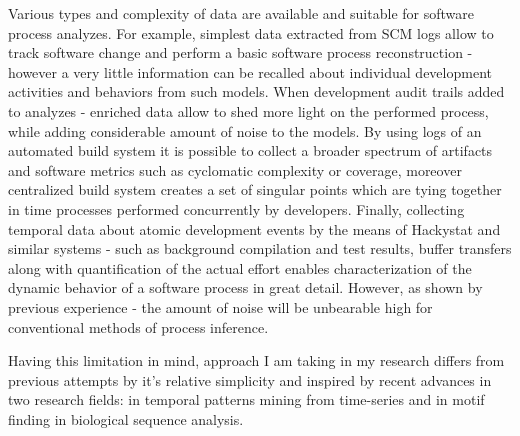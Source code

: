 \documentclass{sig-alternate}
\begin{document}
Various types and complexity of data are available and suitable for software process analyzes. For example, simplest data extracted from SCM logs allow to track software change and perform a basic software process reconstruction - however a very little information can be recalled about individual development activities and behaviors from such models. When development audit trails added to analyzes - enriched data allow to shed more light on the performed process, while adding considerable amount of noise to the models. By using logs of an automated build system it is possible to collect a broader spectrum of artifacts and software metrics such as cyclomatic complexity or coverage, moreover centralized build system creates a set of singular points which are tying together in time processes performed concurrently by developers. Finally, collecting temporal data about atomic development events by the means of Hackystat and similar systems - such as background compilation and test results, buffer transfers along with quantification of the actual effort enables characterization of the dynamic behavior of a software process in great detail. However, as shown by previous experience - the amount of noise will be unbearable high for conventional methods of process inference.

Having this limitation in mind, approach I am taking in my research differs from previous attempts by it's relative simplicity and inspired by recent advances in two research fields: in temporal patterns mining from time-series and in motif finding in biological sequence analysis. 
\end{document}
